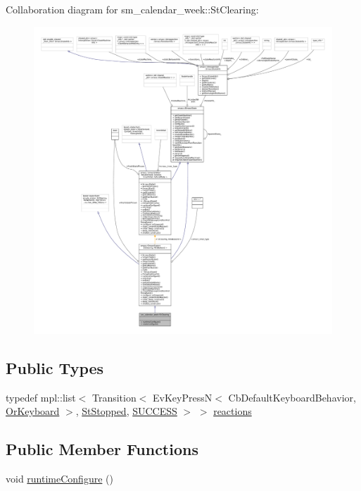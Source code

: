 Collaboration diagram for sm\+\_\+calendar\+\_\+week\+:\+:St\+Clearing\+:
\nopagebreak
\begin{figure}[H]
\begin{center}
\leavevmode
\includegraphics[width=350pt]{structsm__calendar__week_1_1StClearing__coll__graph}
\end{center}
\end{figure}
\subsection*{Public Types}
\begin{DoxyCompactItemize}
\item 
typedef mpl\+::list$<$ Transition$<$ Ev\+Key\+PressN$<$ Cb\+Default\+Keyboard\+Behavior, \hyperlink{classsm__calendar__week_1_1OrKeyboard}{Or\+Keyboard} $>$, \hyperlink{structsm__calendar__week_1_1StStopped}{St\+Stopped}, \hyperlink{classSUCCESS}{S\+U\+C\+C\+E\+SS} $>$ $>$ \hyperlink{structsm__calendar__week_1_1StClearing_a644d912119d8cd0563e897460f824bd5}{reactions}
\end{DoxyCompactItemize}
\subsection*{Public Member Functions}
\begin{DoxyCompactItemize}
\item 
void \hyperlink{structsm__calendar__week_1_1StClearing_a673c4b51c377f97ae3b5232fad0be4fd}{runtime\+Configure} ()
\end{DoxyCompactItemize}

